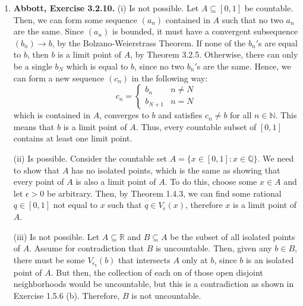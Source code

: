 \documentclass{article}
\newcommand{\N}{\mathbb{N}}
\newcommand{\Q}{\mathbb{Q}}
\newcommand{\R}{\mathbb{R}}
\newcommand{\set}[1]{\{#1\}}
\newcommand{\exc}[2][Abbott]{\item \textbf{#1, Exercise #2.}}
\newcommand{\lep}[1][L]{#1et $\epsilon > 0$ be arbitrary}
\begin{document}
\begin{enumerate}
\begin{enumerate}
        \item For (i), let $\set{E_\lambda : \lambda \in \Lambda}$ be a finite collection of closed sets. Then, 
        \begin{equation*} 
            \left(\bigcup_{\lambda \in \Lambda} E_\lambda \right)^c =
            \bigcap_{\lambda \in \Lambda} E_\lambda^c,
        \end{equation*} but, by Theorem 3.2.13, each $E_\lambda^c$ is open, so a finite intersection of them is also open (Theorem 3.2.3), thus
        \begin{equation*}
            \bigcup_{\lambda \in \Lambda} E_\lambda
        \end{equation*} is closed, again by Theorem 3.2.13. A very similar proof follows for (ii).
    \end{enumerate}
    
    \exc{3.2.10}
    (i) Is not possible. Let $A \subseteq [0, 1]$ be countable. Then, we can form some sequence $(a_n)$ contained in $A$ such that no two $a_n$ are the same. Since $(a_n)$ is bounded, it must have a convergent subsequence $(b_n) \to b$, by the Bolzano-Weierstrass Theorem. If none of the $b_n'$s are equal to $b$, then $b$ is a limit point of $A$, by Theorem 3.2.5. Otherwise, there can only be a single $b_N$ which is equal to $b$, since no two $b_n'$s are the same. Hence, we can form a new sequence $(c_n)$ in the following way:
    \begin{equation*}
        c_n = \begin{cases}
        b_n & n \neq N \\
        b_{N+1} & n = N
        \end{cases}
    \end{equation*} which is contained in $A$, converges to $b$ and satisfies $c_n \neq b$ for all $n \in \N$. This means that $b$ is a limit point of $A$. Thus, every countable subset of $[0, 1]$ contains at least one limit point.
    
    (ii) Is possible. Consider the countable set $A = \set{x \in [0, 1]: x \in \Q}$. We need to show that $A$ has no isolated points, which is the same as showing that every point of $A$ is also a limit point of $A$. To do this, choose some $x \in A$ and \lep[l]. Then, by Theorem 1.4.3, we can find some rational $q \in [0, 1]$ not equal to $x$ such that $q \in V_\epsilon(x)$, therefore $x$ is a limit point of $A$.
    
    (iii) Is not possible. Let $A \subseteq \R$ and $B \subseteq A$ be the subset of all isolated points of $A$. Assume for contradiction that $B$ is uncountable. Then, given any $b \in B$, there must be some $V_{\epsilon_b}(b)$ that intersects $A$ only at $b$, since $b$ is an isolated point of $A$. But then, the collection of each on of those open disjoint neighborhoods would be uncountable, but this is a contradiction as shown in Exercise 1.5.6 (b). Therefore, $B$ is not uncountable.
    

\end{enumerate}
\end{document}
